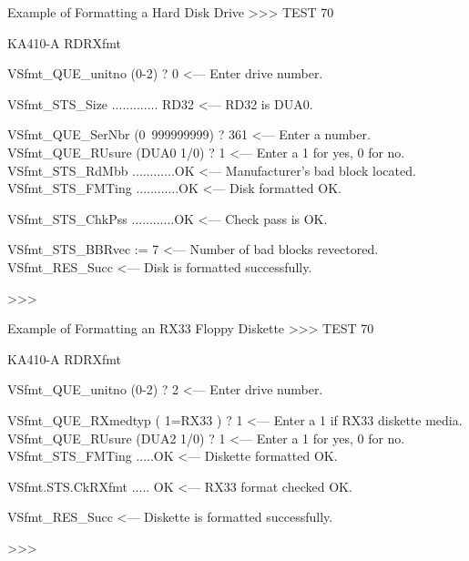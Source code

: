 \begin{ttfig}{Example of Formatting a Hard Disk Drive}
>>> TEST 70

                       KA410-A  RDRXfmt
 
VSfmt_QUE_unitno (0-2) ?  0           <--- Enter drive number.

VSfmt_STS_Size ............. RD32     <--- RD32 is DUA0.

VSfmt_QUE_SerNbr (0~999999999) ? 361  <--- Enter a number.
VSfmt_QUE_RUsure (DUA0 1/0) ? 1       <--- Enter a 1 for yes,
                                           0 for no.
VSfmt_STS_RdMbb ............OK        <--- Manufacturer's bad
                                           block located.
VSfmt_STS_FMTing ............OK       <--- Disk formatted OK.

VSfmt_STS_ChkPss ............OK       <--- Check pass is OK.

VSfmt_STS_BBRvec := 7                 <--- Number of bad blocks
                                           revectored.
VSfmt_RES_Succ                        <--- Disk is formatted
                                           successfully.

>>>
\end{ttfig}

\newpage

\begin{ttfig}{Example of Formatting an RX33 Floppy Diskette}
>>> TEST 70

                       KA410-A  RDRXfmt
 
VSfmt_QUE_unitno (0-2) ?  2        <--- Enter drive number.

VSfmt_QUE_RXmedtyp
( 1=RX33 ) ? 1                     <--- Enter a 1 if RX33
                                        diskette media.
VSfmt_QUE_RUsure (DUA2 1/0) ? 1    <--- Enter a 1 for yes,
                                        0 for no.
VSfmt_STS_FMTing .....OK           <--- Diskette formatted OK.

VSfmt.STS.CkRXfmt ..... OK         <--- RX33 format checked OK.

VSfmt_RES_Succ                     <--- Diskette is formatted
                                        successfully.

>>>
\end{ttfig}

\newpage

